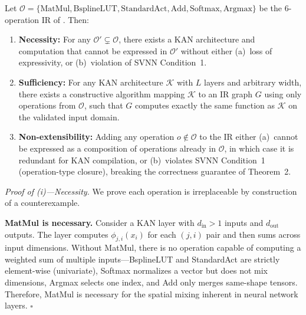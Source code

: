 
\begin{proposition}[IR Minimality]
\label{prop:ir_minimality}
Let $\mathcal{O} = \{\text{MatMul}, \text{BsplineLUT}, \text{StandardAct},
\text{Add}, \text{Softmax}, \text{Argmax}\}$ be the 6-operation IR of
\neuroplc. Then:
\begin{enumerate}
    \item[(i)] \textbf{Necessity:} For any $\mathcal{O}' \subsetneq \mathcal{O}$,
    there exists a KAN architecture and computation that cannot be expressed
    in $\mathcal{O}'$ without either (a)~loss of expressivity, or
    (b)~violation of SVNN Condition~1.
    \item[(ii)] \textbf{Sufficiency:} For any KAN architecture $\mathcal{K}$
    with $L$ layers and arbitrary width, there exists a constructive
    algorithm mapping $\mathcal{K}$ to an IR graph $G$ using only
    operations from $\mathcal{O}$, such that $G$ computes exactly the
    same function as $\mathcal{K}$ on the validated input domain.
    \item[(iii)] \textbf{Non-extensibility:} Adding any operation
    $o \notin \mathcal{O}$ to the IR either (a)~cannot be expressed
    as a composition of operations already in $\mathcal{O}$, in which
    case it is redundant for KAN compilation, or (b)~violates SVNN
    Condition~1 (operation-type closure), breaking the correctness
    guarantee of Theorem~2.
\end{enumerate}
\end{proposition}

\vspace{4pt}
\noindent\textit{Proof of (i)---Necessity.}
We prove each operation is irreplaceable by construction of a
counterexample.

\vspace{2pt}
\noindent\textbf{MatMul is necessary.}
Consider a KAN layer with $d_{\text{in}} > 1$ inputs and $d_{\text{out}}$
outputs. The layer computes $\phi_{j,i}(x_i)$ for each $(j,i)$ pair and
then sums across input dimensions. Without MatMul, there is no operation
capable of computing a weighted sum of multiple inputs---BsplineLUT and
StandardAct are strictly element-wise (univariate), Softmax normalizes
a vector but does not mix dimensions, Argmax selects one index, and Add
only merges same-shape tensors. Therefore, MatMul is necessary for the
spatial mixing inherent in neural network layers. $\square$

